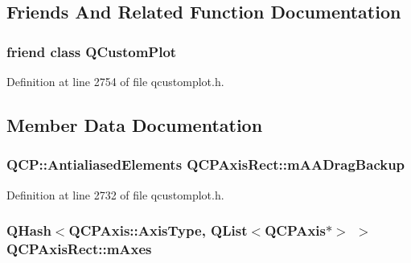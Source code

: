 \subsection{Friends And Related Function Documentation}
\hypertarget{class_q_c_p_axis_rect_a1cdf9df76adcfae45261690aa0ca2198}{
\subsubsection[{Q\-Custom\-Plot}]{\setlength{\rightskip}{0pt plus 5cm}friend class {\bf Q\-Custom\-Plot}\hspace{0.3cm}{\ttfamily [friend]}}}\label{class_q_c_p_axis_rect_a1cdf9df76adcfae45261690aa0ca2198}


Definition at line 2754 of file qcustomplot.\-h.



\subsection{Member Data Documentation}
\hypertarget{class_q_c_p_axis_rect_aa4a24f76360cfebe1bcf17a77fa7521b}{
\subsubsection[{m\-A\-A\-Drag\-Backup}]{\setlength{\rightskip}{0pt plus 5cm}Q\-C\-P\-::\-Antialiased\-Elements Q\-C\-P\-Axis\-Rect\-::m\-A\-A\-Drag\-Backup\hspace{0.3cm}{\ttfamily [protected]}}}\label{class_q_c_p_axis_rect_aa4a24f76360cfebe1bcf17a77fa7521b}


Definition at line 2732 of file qcustomplot.\-h.

\hypertarget{class_q_c_p_axis_rect_afe7a24d2a2bea98fc552fa826350ba81}{
\subsubsection[{m\-Axes}]{\setlength{\rightskip}{0pt plus 5cm}Q\-Hash$<${\bf Q\-C\-P\-Axis\-::\-Axis\-Type}, Q\-List$<${\bf Q\-C\-P\-Axis}$\ast$$>$ $>$ Q\-C\-P\-Axis\-Rect\-::m\-Axes\hspace{0.3cm}{\ttfamily [protected]}}}\label{class_q_c_p_axis_rect_afe7a24d2a2bea98fc552fa826350ba81}


